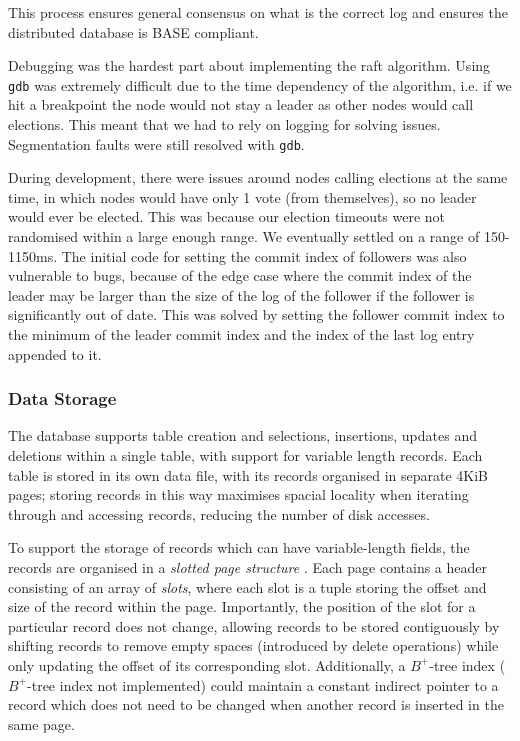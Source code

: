 \documentclass[11pt]{article}
\begin{document}
This process ensures general consensus on what is the correct log and ensures the distributed database is BASE compliant.

Debugging was the hardest part about implementing the raft algorithm. Using \texttt{gdb} was extremely difficult due to the time dependency of the algorithm, i.e. if we hit a breakpoint the node would not stay a leader as other nodes would call elections. This meant that we had to rely on logging for solving issues. Segmentation faults were still resolved with \texttt{gdb}.

During development, there were issues around nodes calling elections at the same time, in which nodes would have only 1 vote (from themselves), so no leader would ever be elected. This was because our election timeouts were not randomised within a large enough range. We eventually settled on a range of 150-1150ms. The initial code for setting the commit index of followers was also vulnerable to bugs, because of the edge case where the commit index of the leader may be larger than the size of the log of the follower if the follower is significantly out of date. This was solved by setting the follower commit index to the minimum of the leader commit index and the index of the last log entry appended to it.

\subsubsection{Data Storage}

The database supports table creation and selections, insertions, updates and deletions within a single table, with support for variable length records. Each table is stored in its own data file, with its records organised in separate 4KiB pages; storing records in this way maximises spacial locality when iterating through and accessing records, reducing the number of disk accesses.

To support the storage of records which can have variable-length fields, the records are organised in a \textit{slotted page structure} \cite{RefWorks:silberschatz2011database}. Each page contains a header consisting of an array of \textit{slots}, where each slot is a tuple storing the offset and size of the record within the page. Importantly, the position of the slot for a particular record does not change, allowing records to be stored contiguously by shifting records to remove empty spaces (introduced by delete operations) while only updating the offset of its corresponding slot. Additionally, a \(B^+\)-tree index (\(B^+\)-tree index not implemented) could maintain a constant indirect pointer to a record which does not need to be changed when another record is inserted in the same page.
\end{document}
